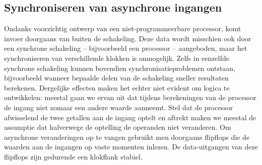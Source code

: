 \subsection{Synchroniseren van asynchrone ingangen}
Ondanks voorzichtig ontwerp van een niet-programmeerbare processor, komt invoer doorgaans van buiten de schakeling. Deze data wordt misschien ook door een synchrone schakeling -- bijvoorbeeld een processor -- aangeboden, maar het synchroniseren van verschillende klokken is onmogelijk. Zelfs in eenzelfde synchrone schakeling kunnen bovendien synchronisatieproblemen ontstaan, bijvoorbeeld wanneer bepaalde delen van de schakeling sneller resultaten berekenen. Dergelijke effecten maken het echter niet evident om logica te ontwikkelen: meestal gaan we ervan uit dat tijdens berekeningen van de processor de ingang niet zomaar een andere waarde aanneemt. Stel dat de processor afwisselend de twee getallen aan de ingang optelt en aftrekt maken we meestal de assumptie dat halverwege de optelling de operanden niet veranderen. Om asynchrone veranderingen op te vangen gebruikt men doorgaans flipflops die de waarden aan de ingangen op vaste momenten inlezen. De data-uitgangen van deze flipflops zijn gedurende een klokflank stabiel.
